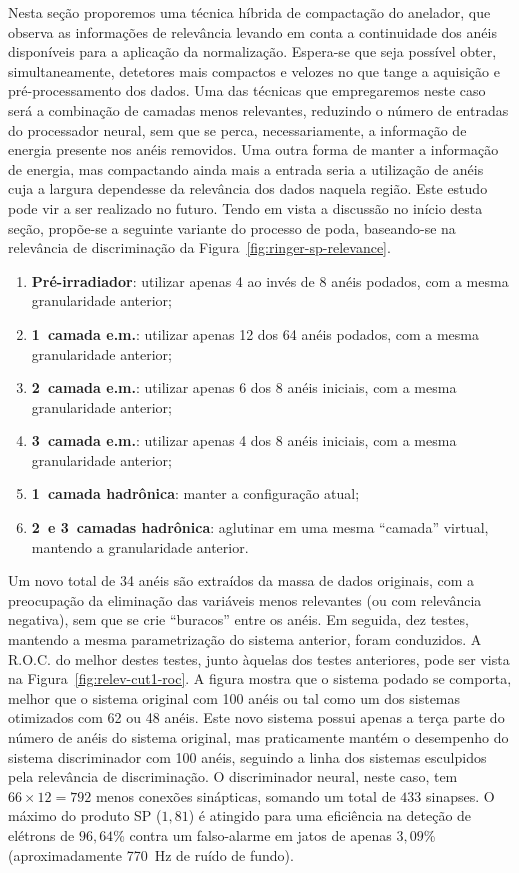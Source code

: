 Nesta seção proporemos uma técnica híbrida de compactação do anelador, que
observa as informações de relevância levando em conta a continuidade dos anéis
disponíveis para a aplicação da normalização. Espera-se que seja possível
obter, simultaneamente, detetores mais compactos e velozes no que tange a
aquisição e pré-processamento dos dados. Uma das técnicas que empregaremos
neste caso será a combinação de camadas menos relevantes, reduzindo o número
de entradas do processador neural, sem que se perca, necessariamente, a
informação de energia presente nos anéis removidos. Uma outra forma de manter
a informação de energia, mas compactando ainda mais a entrada seria a
utilização de anéis cuja a largura dependesse da relevância dos dados naquela
região. Este estudo pode vir a ser realizado no futuro. Tendo em vista a
discussão no início desta seção, propõe-se a seguinte variante do processo de
poda, baseando-se na relevância de discriminação da
Figura~\ref{fig:ringer-sp-relevance}.

\begin{enumerate}
\item \textbf{Pré-irradiador}: utilizar apenas 4 ao invés de 8 anéis podados,
com a mesma granularidade anterior;
\item \textbf{1\eira\ camada e.m.}: utilizar apenas 12 dos 64 anéis podados,
com a mesma granularidade anterior;
\item \textbf{2\eira\ camada e.m.}: utilizar apenas 6 dos 8 anéis iniciais,
com a mesma granularidade anterior;
\item \textbf{3\eira\ camada e.m.}: utilizar apenas 4 dos 8 anéis iniciais,
com a mesma granularidade anterior;
\item \textbf{1\eira\ camada hadrônica}: manter a configuração atual;
\item \textbf{2\eira\ e 3\eira\ camadas hadrônica}: aglutinar em uma mesma
``camada'' virtual, mantendo a granularidade anterior.
\end{enumerate} 

Um novo total de 34 anéis são extraídos da massa de dados originais, com a
preocupação da eliminação das variáveis menos relevantes (ou com relevância
negativa), sem que se crie ``buracos'' entre os anéis. Em seguida, dez testes,
mantendo a mesma parametrização do sistema anterior, foram conduzidos. A
R.O.C. do melhor destes testes, junto àquelas dos testes anteriores, pode ser
vista na Figura~\ref{fig:relev-cut1-roc}. A figura mostra que o sistema podado
se comporta, melhor que o sistema original com 100 anéis ou tal como um dos
sistemas otimizados com 62 ou 48 anéis. Este novo sistema possui apenas a
terça parte do número de anéis do sistema original, mas praticamente mantém o
desempenho do sistema discriminador com 100 anéis, seguindo a linha dos
sistemas esculpidos pela relevância de discriminação. O discriminador neural,
neste caso, tem $66 \times 12 = 792$ menos conexões sinápticas, somando um
total de $433$ sinapses. O máximo do produto SP ($1,81$) é atingido para uma
eficiência na deteção de elétrons de $96,64$\% contra um falso-alarme em jatos
de apenas $3,09$\% (aproximadamente 770~Hz de ruído de fundo).

